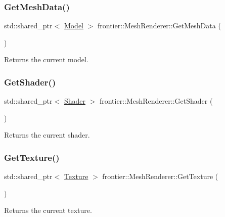 \subsubsection{\texorpdfstring{Get\+Mesh\+Data()}{GetMeshData()}}
{\footnotesize\ttfamily std\+::shared\+\_\+ptr$<$ \hyperlink{classfrontier_1_1_model}{Model} $>$ frontier\+::\+Mesh\+Renderer\+::\+Get\+Mesh\+Data (\begin{DoxyParamCaption}{ }\end{DoxyParamCaption})}



Returns the current model. 

\mbox{\label{classfrontier_1_1_mesh_renderer_a55c8a2d3b8f64767e5b1bcf2a28ec044}} 
\subsubsection{\texorpdfstring{Get\+Shader()}{GetShader()}}
{\footnotesize\ttfamily std\+::shared\+\_\+ptr$<$ \hyperlink{classfrontier_1_1_shader}{Shader} $>$ frontier\+::\+Mesh\+Renderer\+::\+Get\+Shader (\begin{DoxyParamCaption}{ }\end{DoxyParamCaption})}



Returns the current shader. 

\mbox{\label{classfrontier_1_1_mesh_renderer_a408e31822fdceac2dd5c85527c47b100}} 
\subsubsection{\texorpdfstring{Get\+Texture()}{GetTexture()}}
{\footnotesize\ttfamily std\+::shared\+\_\+ptr$<$ \hyperlink{classfrontier_1_1_texture}{Texture} $>$ frontier\+::\+Mesh\+Renderer\+::\+Get\+Texture (\begin{DoxyParamCaption}{ }\end{DoxyParamCaption})}



Returns the current texture. 

